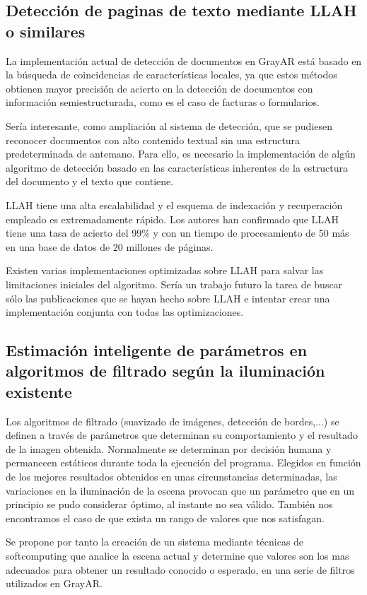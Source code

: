 \subsection{Detección de paginas de texto mediante LLAH o similares}
La implementación actual de detección de documentos en GrayAR está basado en la búsqueda de coincidencias de características locales, ya que estos métodos obtienen mayor precisión de acierto en la detección de documentos con información semiestructurada, como es el caso de facturas o formularios. 

Sería interesante, como ampliación al sistema de detección, que se pudiesen reconocer documentos con alto contenido textual sin una estructura predeterminada de antemano. Para ello, es necesario la implementación de algún algoritmo de detección basado en las características inherentes de la estructura del documento y el texto que contiene. 

LLAH \cite{Nakai} tiene una alta escalabilidad y el esquema de indexación y recuperación empleado es extremadamente rápido. Los autores han confirmado que LLAH tiene una tasa de acierto del 99\% y con un tiempo de procesamiento de 50 más en una base de datos de 20 millones de páginas. 

Existen varias implementaciones optimizadas sobre LLAH para salvar las limitaciones iniciales del algoritmo. Sería un trabajo futuro la tarea de buscar sólo las publicaciones que se hayan hecho sobre LLAH e intentar crear una implementación conjunta con todas las optimizaciones.

\subsection{Estimación inteligente de parámetros en algoritmos de filtrado según la iluminación existente}
Los algoritmos de filtrado (suavizado de imágenes, detección de bordes,...) se definen a través de parámetros que determinan su comportamiento y el resultado de la imagen obtenida. Normalmente se determinan por decisión humana y permanecen estáticos durante toda la ejecución del programa. Elegidos en función de los mejores resultados obtenidos en unas circunstancias determinadas, las variaciones en la iluminación de la escena provocan que un parámetro que en un principio se pudo considerar óptimo, al instante no sea válido. También nos encontramos el caso de que exista un rango de valores que nos satisfagan.

Se propone por tanto la creación de un sistema mediante técnicas de softcomputing que analice la escena actual y determine que valores son los mas adecuados para obtener un resultado conocido o esperado, en una serie de filtros utilizados en GrayAR.

